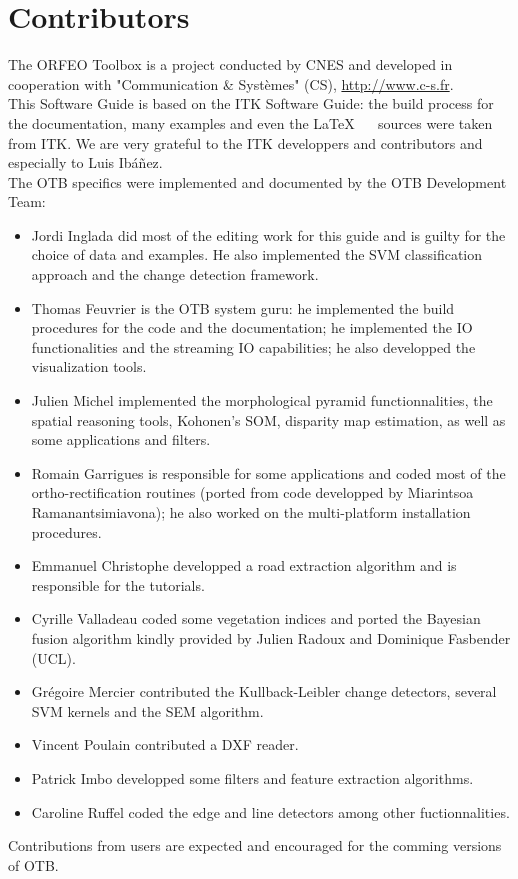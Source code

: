 \chapter*{Contributors}
\noindent

The ORFEO Toolbox is a project conducted by CNES and developed in
cooperation with "Communication \&
  Syst\`{e}mes" (CS), \url{http://www.c-s.fr}.\\

This Software Guide is based on the ITK Software Guide: the build
process for the documentation, many examples and even the \LaTeX~ ~
sources were taken from ITK. We are very grateful to the ITK
developpers and contributors and especially to Luis Ib\'a\~nez.\\

The OTB specifics were implemented and documented by the OTB Development Team:
\begin{itemize}
  \item Jordi Inglada did most of the editing work for this guide and
  is guilty for the choice of data and examples. He also implemented
  the SVM classification approach and the change detection framework.
  \item Thomas Feuvrier is the OTB system guru: he implemented the
  build procedures for the code and the documentation; he implemented
  the IO functionalities and the streaming IO capabilities; he also
  developped the visualization tools.
  \item Julien Michel implemented the morphological pyramid
  functionnalities, the spatial reasoning tools, Kohonen's SOM,
  disparity map estimation, as
  well as some applications and filters.
\item Romain Garrigues is responsible for some applications and coded
  most of the ortho-rectification routines (ported from code
  developped by Miarintsoa Ramanantsimiavona); he also
  worked on the multi-platform installation procedures.
\item Emmanuel Christophe developped a road extraction algorithm and
  is responsible for the tutorials.
  \item Cyrille Valladeau coded some vegetation indices and ported the
  Bayesian fusion algorithm kindly provided by Julien Radoux and Dominique Fasbender (UCL).
  \item Gr\'egoire Mercier contributed the Kullback-Leibler change
  detectors, several SVM kernels and the SEM algorithm.
  \item Vincent Poulain contributed a DXF reader. 
  \item Patrick Imbo developped some filters and feature
  extraction algorithms.
  \item Caroline Ruffel coded the edge and line detectors among other
  fuctionnalities.



\end{itemize}

Contributions from users are expected and encouraged for the comming
versions of OTB.


